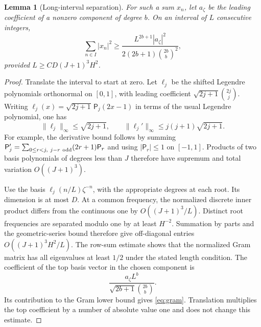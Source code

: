 \documentclass[11pt]{amsart}
\numberwithin{equation}{section}
\newtheorem{lemma}[theorem]{Lemma}
\theoremstyle{remark}
\begin{document}
\begin{lemma}[Long-interval separation]\label{lem:gram}
For such a sum \(x_n\), let \(a_\zeta\) be the leading coefficient of
a nonzero component of degree \(b\). On an interval of \(L\) consecutive
integers,
\begin{equation}\label{eq:gram}
 \sum_{n\in I}|x_n|^2
 \ge\frac{L^{2b+1}|a_\zeta|^2}
 {2(2b+1)\binom{2b}{b}^2},
\end{equation}
provided \(L\ge CD(J+1)^3H^2\).
\end{lemma}
\begin{proof}
Translate the interval to start at zero.
Let \(\ell_j\) be the shifted Legendre polynomials orthonormal on
\([0,1]\), with leading coefficient
\(\sqrt{2j+1}\binom{2j}{j}\).
Writing \(\ell_j(x)=\sqrt{2j+1}\,\mathsf P_j(2x-1)\) in terms of the usual
Legendre polynomial, one has
\[
 \|\ell_j\|_\infty\le\sqrt{2j+1},\qquad
 \|\ell_j'\|_\infty\le j(j+1)\sqrt{2j+1}.
\]
For example, the derivative bound follows by summing
\(\mathsf P_j'=\sum_{0\le r<j,\ j-r\ {\rm odd}}(2r+1)\mathsf P_r\) and using
\(|\mathsf P_r|\le1\) on \([-1,1]\).
Products of two basis polynomials of degrees less than \(J\)
therefore have supremum and total variation \(O((J+1)^3)\).

Use the basis \(\ell_j(n/L)\zeta^{-n}\), with the appropriate degrees
at each root. Its dimension is at most \(D\).
At a common frequency, the normalized discrete inner product differs
from the continuous one by \(O((J+1)^3/L)\).
Distinct root frequencies are separated modulo one by at least \(H^{-2}\).
Summation by parts and the geometric-series bound therefore give
off-diagonal entries \(O((J+1)^3H^2/L)\).
The row-sum estimate shows that the normalized Gram matrix has all
eigenvalues at least \(1/2\) under the stated length condition.
The coefficient of the top basis vector in the chosen component is
\[
 \frac{a_\zeta L^b}{\sqrt{2b+1}\binom{2b}{b}}.
\]
Its contribution to the Gram lower bound gives \eqref{eq:gram}.
Translation multiplies the top coefficient by a number of absolute
value one and does not change this estimate.
\end{proof}
\end{document}

